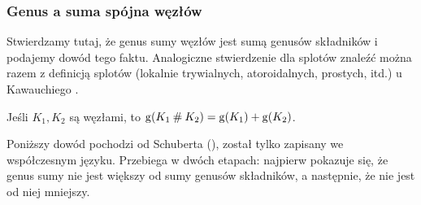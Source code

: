
\subsubsection{Genus a suma spójna węzłów}

Stwierdzamy tutaj, że genus sumy węzłów jest sumą genusów składników i podajemy dowód tego faktu.
Analogiczne stwierdzenie dla splotów znaleźć można razem z definicją splotów (lokalnie trywialnych, atoroidalnych, prostych, itd.) u Kawauchiego \cite[s. 33-34]{kawauchi96}.
%
%
%

\begin{proposition}
    \label{prp:genus_of_sum}
    Jeśli $K_1, K_2$ są węzłami, to $\operatorname{g} (K_1 \mathbin{\#} K_2) = \operatorname{g} (K_1) + \operatorname{g} (K_2)$.
\end{proposition}

Poniższy dowód pochodzi od Schuberta (\cite{schubert49}), został tylko zapisany we współczesnym języku.
%
Przebiega w dwóch etapach: najpierw pokazuje się, że genus sumy nie jest większy od sumy genusów składników, a następnie, że nie jest od niej mniejszy.

